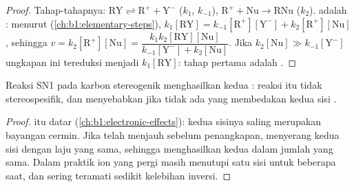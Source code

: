 \begin{proof}
Tahap-tahapnya: $\mathrm{RY} \rightleftharpoons \mathrm{R^+} + \mathrm{Y^-}$ ($k_1$,
$k_{-1}$), $\mathrm{R^+} + \mathrm{Nu} \to \mathrm{RNu}$ ($k_2$).
 adalah : menurut 
(\cref{ch:b1:elementary-steps}), $k_1[\mathrm{RY}] =
k_{-1}[\mathrm{R^+}][\mathrm{Y^-}] + k_2[\mathrm{R^+}][\mathrm{Nu}]$, sehingga
$v = k_2[\mathrm{R^+}][\mathrm{Nu}] = \dfrac{k_1k_2[\mathrm{RY}][\mathrm{Nu}]}
{k_{-1}[\mathrm{Y^-}] + k_2[\mathrm{Nu}]}$. Jika $k_2[\mathrm{Nu}] \gg
k_{-1}[\mathrm{Y^-}]$ ungkapan ini tereduksi menjadi $k_1[\mathrm{RY}]$:
tahap pertama adalah .
\end{proof}

\begin{proposition}[Stereokimia SN1]\label{prop:b1:nucleophilic-substitution:sn1-stereo}
Reaksi SN1 pada karbon stereogenik menghasilkan kedua :
reaksi itu tidak stereospesifik, dan menyebabkan  jika tidak
ada yang membedakan kedua sisi .
\end{proposition}

\begin{proof}
 itu datar (\cref{ch:b1:electronic-effects}): kedua sisinya
saling merupakan bayangan cermin. Jika  telah menjauh sebelum
penangkapan,  menyerang kedua sisi dengan laju yang sama,
sehingga menghasilkan kedua  dalam jumlah yang sama. Dalam
praktik ion yang pergi masih menutupi satu sisi untuk beberapa saat, dan
sering teramati sedikit kelebihan inversi.
\end{proof}

